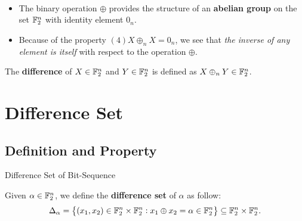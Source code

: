 \documentclass[11pt,openany]{article}
\begin{document}
\begin{remark}
\ \begin{itemize}
	\item The binary operation $\oplus$ provides the structure of an \textbf{abelian group} on the set $\mathbb{F}_2^n$ with identity element $0_n$.
	\item Because of the property $(4) X\oplus_n X=0_n$, we see that \textit{the inverse of any element is itself} with respect to the operation $\oplus$.
\end{itemize}
\end{remark}

\begin{defbox}{}
	\begin{definition}
		The \textbf{difference} of $X\in\mathbb{F}_2^n$ and $Y\in\mathbb{F}_2^n$ is defined as $X\oplus_n Y\in\mathbb{F}_2^n$.
	\end{definition}
\end{defbox}

\newpage
\section{Difference Set}
\subsection{Definition and Property}
\begin{defbox}{Difference Set of Bit-Sequence}
	\begin{definition}
		Given $\alpha\in\mathbb{F}_2^n$, we define the \textbf{difference set} of $\alpha$ as follow: \[
		\Delta_\alpha=\set{(x_1,x_2)\in\mathbb{F}_2^n\times\mathbb{F}_2^n:x_1\oplus x_2=\alpha\in\mathbb{F}_2^n}\subseteq\mathbb{F}_2^n\times\mathbb{F}_2^n.
		\]
	\end{definition}
\end{defbox}
\end{document}
